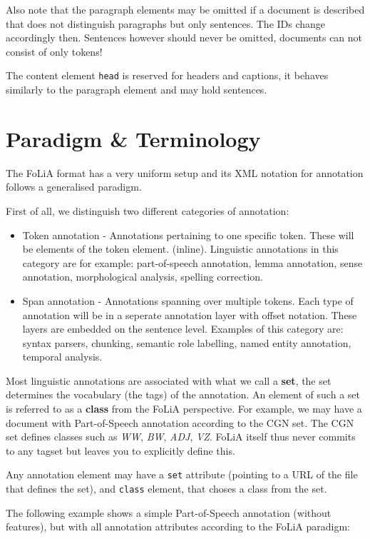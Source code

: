 \documentclass[a4paper,12pt]{article}
\begin{document}
Also note that the paragraph elements may be omitted if a document is described that does not distinguish paragraphs but only sentences. The IDs change accordingly then. Sentences however should never be omitted, documents can not consist of only tokens!

The content element \texttt{head} is reserved for headers and captions, it behaves similarly to the paragraph element and may hold sentences.

\section{Paradigm \& Terminology}
\label{sec:paradigm}

The FoLiA format has a very uniform setup and its XML notation for annotation follows a generalised paradigm.

First of all, we distinguish two different categories of annotation:

\begin{itemize}
\item Token annotation - Annotations pertaining to one specific token. These will be elements of the token element. (inline). Linguistic annotations in this category are for example: part-of-speech annotation, lemma annotation, sense annotation, morphological analysis, spelling correction.
\item Span annotation - Annotations spanning over multiple tokens. Each type of annotation will be in a seperate annotation layer with offset notation. These layers are embedded on the sentence level. Examples of this category are: syntax parsers, chunking, semantic role labelling, named entity annotation, temporal analysis.
\end{itemize}

Most linguistic annotations are associated with what we call a \textbf{set}, the set determines the vocabulary (the tags) of the annotation. An element of such a set is referred to as a \textbf{class} from the FoLiA perspective. For example, we may have a document with Part-of-Speech annotation according to the CGN set. The CGN set defines classes such as \emph{WW}, \emph{BW}, \emph{ADJ}, \emph{VZ}. FoLiA itself thus never commits to any tagset but leaves you to explicitly define this. 

Any annotation element may have a \texttt{set} attribute (pointing to a URL of the file that defines the set), and \texttt{class} element, that choses a class from the set.

The following example shows a simple Part-of-Speech annotation (without features), but with all annotation attributes according to the FoLiA paradigm:
\end{document}
